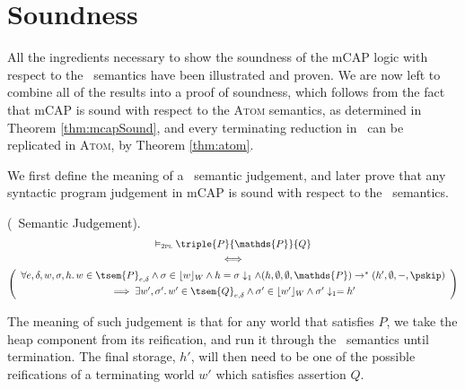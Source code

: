 







\section{Soundness}

All the ingredients necessary to show the soundness of the mCAP logic with respect to the \tpl\ semantics have been illustrated and proven. We are now left to combine all of the results into a proof of soundness, which follows from the fact that mCAP is sound with respect to the \textsc{Atom} semantics, as determined in Theorem \ref{thm:mcapSound}, and every terminating reduction in \tpl\ can be replicated in \textsc{Atom}, by Theorem \ref{thm:atom}.

We first define the meaning of a \tpl\ semantic judgement, and later prove that any syntactic program judgement in mCAP is sound with respect to the \tpl\ semantics.
\begin{defn}
	(\tpl\ Semantic Judgement).
	\begin{gather*}
		\vDash_\textsc{2pl} \triple{P}{\mathds{P}}{Q} \\
		\iff \\
		\left(
		\begin{array}{c}
			\forall e, \delta, w, \sigma, h \ldotp
			w \in \tsem{P}_{e, \delta} \land \sigma \in \lfloor w \rfloor_W \land h = \sigma \downarrow_1 \land (h, \emptyset, \emptyset, \mathds{P}) \rightarrow^* (h', \emptyset, -, \pskip) \\[0.4em]
			\implies \exists w', \sigma' \ldotp w' \in \tsem{Q}_{e, \delta} \land \sigma' \in \lfloor w' \rfloor_W \land \sigma' \downarrow_1 = h'
		\end{array}
		\right)
	\end{gather*}
\end{defn}

The meaning of such judgement is that for any world that satisfies $P$, we take the heap component from its reification, and run it through the \tpl\ semantics until termination. The final storage, $h'$, will then need to be one of the possible reifications of a terminating world $w'$ which satisfies assertion $Q$.


